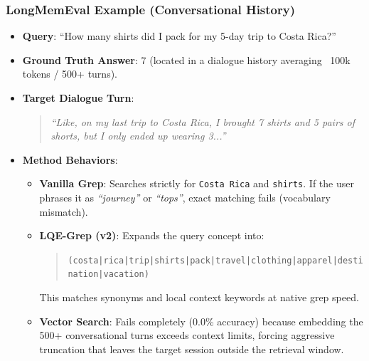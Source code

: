 \documentclass[11pt,a4paper]{article}
\begin{document}
\subsubsection{LongMemEval Example (Conversational History)}
\begin{itemize}
    \item \textbf{Query}: ``How many shirts did I pack for my 5-day trip to Costa Rica?''
    \item \textbf{Ground Truth Answer}: 7 (located in a dialogue history averaging ~100k tokens / 500+ turns).
    \item \textbf{Target Dialogue Turn}: 
    \begin{quote}
        \textit{``Like, on my last trip to Costa Rica, I brought 7 shirts and 5 pairs of shorts, but I only ended up wearing 3...''}
    \end{quote}
    \item \textbf{Method Behaviors}:
    \begin{itemize}
        \item \textbf{Vanilla Grep}: Searches strictly for \texttt{Costa Rica} and \texttt{shirts}. If the user phrases it as \textit{``journey''} or \textit{``tops''}, exact matching fails (vocabulary mismatch).
        \item \textbf{LQE-Grep (v2)}: Expands the query concept into:
        \begin{quote}
            \texttt{(costa|rica|trip|shirts|pack|travel|clothing|apparel|destination|vacation)}
        \end{quote}
        This matches synonyms and local context keywords at native grep speed.
        \item \textbf{Vector Search}: Fails completely (0.0\% accuracy) because embedding the 500+ conversational turns exceeds context limits, forcing aggressive truncation that leaves the target session outside the retrieval window.
    \end{itemize}
\end{itemize}
\end{document}
